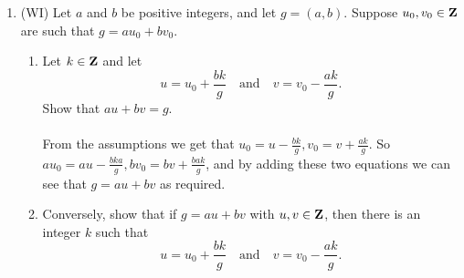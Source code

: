 \documentclass[12pt]{article}
\begin{document}
\begin{enumerate}
	\item (WI) Let $a$ and $b$ be positive integers, and let $g=(a,b)$. Suppose $u_0,v_0\in\mathbf{Z}$ are such that $g=au_0+bv_0$.
	\begin{enumerate}
		\item Let $k\in\mathbf{Z}$ and let
		\[
			u=u_0+\frac{bk}{g}\quad\text{and}\quad v=v_0-\frac{ak}{g}.
		\]
		Show that $au+bv=g$.\\\\
		From the assumptions we get that $u_0 = u - \frac{bk}{g}, v_0 = v + \frac{ak}{g}$.  So $au_0 = au - \frac{bka}{g}, bv_0 = bv + \frac{bak}{g}$, and by adding these two equations we can see that  $g = au + bv$ as required. \\
		\item Conversely, show that if $g=au+bv$ with $u,v\in\mathbf{Z}$, then there is an integer $k$ such that
		\[
			u=u_0+\frac{bk}{g}\quad\text{and}\quad v=v_0-\frac{ak}{g}.
		\]
	\end{enumerate}
\end{enumerate}
\end{document}
